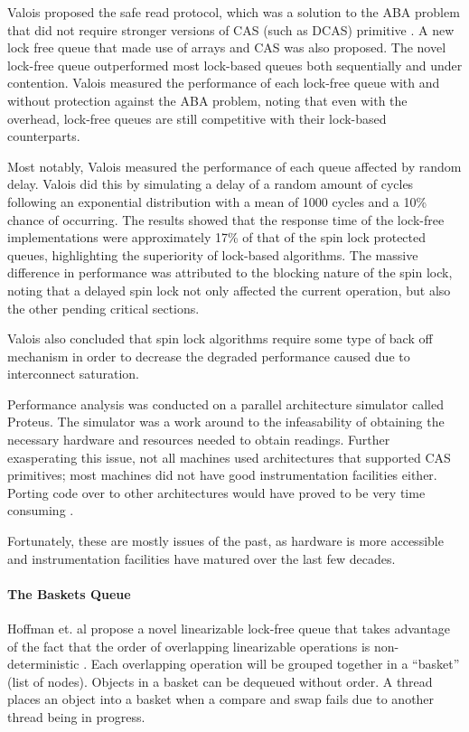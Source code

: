 \documentclass[a4paper, 12pt, titlepage]{article}
\begin{document}
\begin{singlespace}
Valois proposed the safe read protocol, which was a solution to the ABA problem that did not require stronger versions of CAS (such as DCAS) primitive \cite{valois1994implementing, valois1995lock}. A new lock free queue that made use of arrays and CAS was also proposed. The novel lock-free queue outperformed most lock-based queues both sequentially and under contention. Valois measured the performance of each lock-free queue with and without protection against the ABA problem, noting that even with the overhead, lock-free queues are still competitive with their lock-based counterparts.

Most notably, Valois measured the performance of each queue affected by random delay. Valois did this by simulating a delay of a random amount of cycles following an exponential distribution with a mean of 1000 cycles and a 10\% chance of occurring. The results showed that the response time of the lock-free implementations were approximately 17\% of that of the spin lock protected queues, highlighting the superiority of lock-based algorithms. The massive difference in performance was attributed to the blocking nature of the spin lock, noting that a delayed spin lock not only affected the current operation, but also the other pending critical sections.

Valois also concluded that spin lock algorithms require some type of back off mechanism in order to decrease the degraded performance caused due to interconnect saturation.

Performance analysis was conducted on a parallel architecture simulator called Proteus. The simulator was a work around to the infeasability of obtaining the necessary hardware and resources needed to obtain readings. Further exasperating this issue, not all machines used architectures that supported CAS primitives; most machines did not have good instrumentation facilities either. Porting code over to other architectures would have proved to be very time consuming \cite{valois1994implementing, valois1995lock}. 

Fortunately, these are mostly issues of the past, as hardware is more accessible and instrumentation facilities have matured over the last few decades.

\paragraph{The Baskets Queue}
Hoffman et. al propose a novel linearizable lock-free queue that takes advantage of the fact that the order of overlapping linearizable operations is non-deterministic \cite{hoffman2007baskets}. Each overlapping operation will be grouped together in a ``basket'' (list of nodes). Objects in a basket can be dequeued without order. A thread places an object into a basket when a compare and swap fails due to another thread being in progress.


\end{singlespace}
\end{document}
